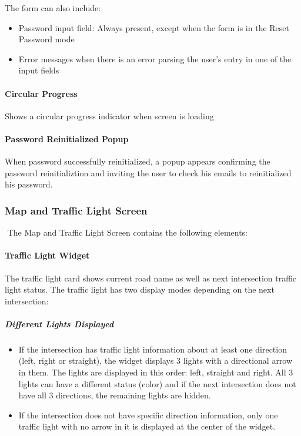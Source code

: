 \documentclass[letterpaper,10pt,english]{sphinxmanual}
\begin{document}
The form can also include:
\begin{itemize}
\item {} 
Password input field: Always present, except when the form is in the Reset Password mode

\item {} 
Error messages when there is an error parsing the user’s entry in one of the input fields

\end{itemize}


\paragraph{Circular Progress}
\label{\detokenize{microservices/driver_app/screens:circular-progress}}
Shows a circular progress indicator when screen is loading


\paragraph{Password Reinitialized Popup}
\label{\detokenize{microservices/driver_app/screens:password-reinitialized-popup}}
When password successfully reinitialized, a popup appears confirming the password reinitializtion and inviting the user to check his emails to reinitialized his password.


\subsubsection{Map and Traffic Light Screen}
\label{\detokenize{microservices/driver_app/screens:map-and-traffic-light-screen}}
​
The Map and Traffic Light Screen contains the following elements:


\paragraph{Traffic Light Widget}
\label{\detokenize{microservices/driver_app/screens:traffic-light-widget}}
The traffic light card shows current road name as well as next intersection traffic light status. The traffic light has two display modes depending on the next intersection:


\subparagraph{Different Lights Displayed}
\label{\detokenize{microservices/driver_app/screens:different-lights-displayed}}\begin{itemize}
\item {} 
If the intersection has traffic light information about at least one direction (left, right or straight), the widget displays 3 lights with a directional arrow in them. The lights are displayed in this order: left, straight and right. All 3 lights can have a different status (color) and if the next intersection does not have all 3 directions, the remaining lights are hidden.

\item {} 
If the intersection does not have specific direction information, only one traffic light with no arrow in it is displayed at the center of the widget.

\end{itemize}
\end{document}

